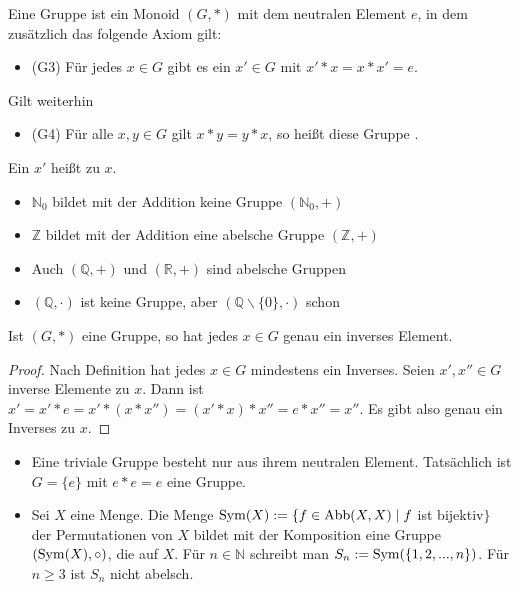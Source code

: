 \begin{definition}
	Eine Gruppe ist ein Monoid $(G,*)$ mit dem neutralen Element
	$e$, in dem zusätzlich das folgende Axiom gilt:
	\begin{itemize}
		\item (G3) Für jedes $x \in G$ gibt es ein $x' \in G$ mit $x'*x=x*x'=e$.
	\end{itemize}
	Gilt weiterhin
	\begin{itemize}
		\item (G4) Für alle $x,y \in G$ gilt $x*y=y*x$, so heißt diese Gruppe .
	\end{itemize}
\end{definition}

Ein $x'$ heißt  zu $x$. \\

\begin{example}
	\begin{itemize}
		\item $\mathbb N_0$ bildet mit der Addition keine Gruppe $(\mathbb N_0,+)$
		\item $\mathbb Z$ bildet mit der Addition eine abelsche Gruppe $(\mathbb Z,+)$
		\item Auch $(\mathbb Q,+)$ und $(\mathbb R,+)$ sind abelsche Gruppen
		\item $(\mathbb Q,\cdot)$ ist keine Gruppe, aber $(\mathbb Q\backslash\{0\},\cdot)$ schon
	\end{itemize}
\end{example}

\begin{proposition}
	Ist $(G,*)$ eine Gruppe, so hat jedes $x \in G$ genau ein inverses Element.
\end{proposition}
\begin{proof}
	Nach Definition hat jedes $x\in G$ mindestens ein Inverses. Seien $x',x''\in G$ inverse Elemente zu $x$. Dann ist 
	$x'=x'*e=x'*(x*x'')=(x'*x)*x''=e*x''=x''$. Es gibt also genau ein Inverses zu $x$.
\end{proof}

\begin{example}
	\begin{itemize}
		\item Eine triviale Gruppe besteht nur aus ihrem neutralen Element. Tatsächlich ist $G=\{e\}$ mit
		$e*e=e$ eine Gruppe.
		\item Sei $X$ eine Menge. Die Menge $\operatorname{Sym}(X) := \{f \in \operatorname{Abb}(X,X) \mid f$ ist bijektiv$\}$ der
		Permutationen von $X$ bildet mit der Komposition eine Gruppe $(\operatorname{Sym}(X),\circ)$, die 
		 auf $X$. Für $n \in \mathbb N$ schreibt man $S_n := \operatorname{Sym}(\{1,2,...,n\})$. 
		Für $n \ge 3$ ist $S_n$ nicht abelsch.
	\end{itemize}
\end{example}

